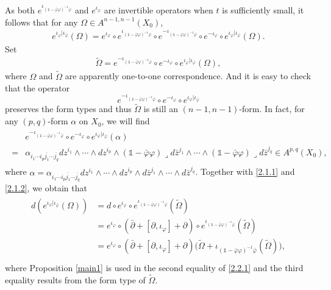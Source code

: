 \documentclass[12pt]{amsart}
\numberwithin{equation}{section}
\renewcommand{\1}{\mathds{1}}
\renewcommand{\>}{\rightarrow}
\newcommand{\p}{\partial}
\def\p{\partial}
\def\o{\overline}
\def\b{\bar}
\def\l{\lrcorner}
\begin{document}
As both $e^{\iota_{(\1-\b{\varphi}\varphi)^{-1}\b{\varphi}}}$ and
$e^{\iota_{\varphi}}$ are invertible operators when $t$ is
sufficiently small, it follows that for any $\Omega \in
A^{n-1,n-1}(X_0)$,
\begin{align}\label{2.1.1}
  e^{\iota_{\varphi}|\iota_{\b{\varphi}}}(\Omega)=e^{\iota_{\varphi}}\circ e^{\iota_{(\1-\b{\varphi}\varphi)^{-1}\b{\varphi}}}\circ e^{-\iota_{(\1-\b{\varphi}\varphi)^{-1}\b{\varphi}}}\circ e^{-\iota_{\varphi}}\circ e^{\iota_{\varphi}|\iota_{\b{\varphi}}}(\Omega).
\end{align}
Set
\begin{align}\label{2.1.2}
  \tilde{\Omega}=e^{-\iota_{(\1-\b{\varphi}\varphi)^{-1}\b{\varphi}}}\circ e^{-\iota_{\varphi}}\circ e^{\iota_{\varphi}|\iota_{\b{\varphi}}}(\Omega),
\end{align}
where $\Omega$ and $\tilde{\Omega}$ are apparently one-to-one
correspondence. And it is easy to check that the operator
$$e^{-\iota_{(\1-\b{\varphi}\varphi)^{-1}\b{\varphi}}}\circ
e^{-\iota_{\varphi}}\circ e^{\iota_{\varphi}|\iota_{\b{\varphi}}}$$
preserves the form types and thus $\tilde{\Omega}$ is still an
$(n-1,n-1)$-form. In fact, for any $(p,q)$-form $\alpha$ on $X_0$,
we will find
\begin{align*}
\begin{split}
& e^{-\iota_{(\1-\b{\varphi}\varphi)^{-1}\b{\varphi}}}\circ
e^{-\iota_{\varphi}}\circ e^{\iota_{\varphi}|\iota_{\b{\varphi}}}(\alpha) \\
=&\alpha_{i_1\cdots i_p\o{j_1}\cdots\o{j_q}}
dz^{i_1}\wedge\cdots\wedge dz^{i_p} \wedge(\1-\b{\varphi}\varphi)\l
d\b{z}^{j_1}\wedge \cdots\wedge (\1-\b{\varphi}\varphi)\l
d\b{z}^{j_q}\in A^{p,q}(X_0),
\end{split}
\end{align*}
where $\alpha=\alpha_{i_1\cdots
i_p\o{j_1}\cdots\o{j_q}}dz^{i_1}\wedge\cdots\wedge dz^{i_p}\wedge
d\b{z}^{j_1}\wedge \cdots\wedge d\b{z}^{j_q}$. Together with
\eqref{2.1.1} and \eqref{2.1.2}, we obtain that
\begin{align}\label{2.2.1}
\begin{split}
  d(e^{\iota_{\varphi}|\iota_{\b{\varphi}}}(\Omega))&=d\circ e^{\iota_{\varphi}}\circ e^{\iota_{(\1-\b{\varphi}\varphi)^{-1}\b{\varphi}}}(\tilde{\Omega}) \\
                                                    &=e^{\iota_{\varphi}}\circ(\b{\p}+[\p, \iota_{\varphi}]+\p)\circ e^{\iota_{(\1-\b{\varphi}\varphi)^{-1}\b{\varphi}}}(\tilde{\Omega}) \\
                                                    &=e^{\iota_{\varphi}}\circ(\b{\p}+[\p,\iota_{\varphi}]+\p)
                                                    \big(\tilde{\Omega}+\iota_{(\1-\b{\varphi}\varphi)^{-1}\b{\varphi}}(\tilde{\Omega})\big), \\
\end{split}
\end{align}
where Proposition \ref{main1} is used in the second equality of \eqref{2.2.1}
and the third equality results from the form type of
$\tilde{\Omega}$.
\end{document}
